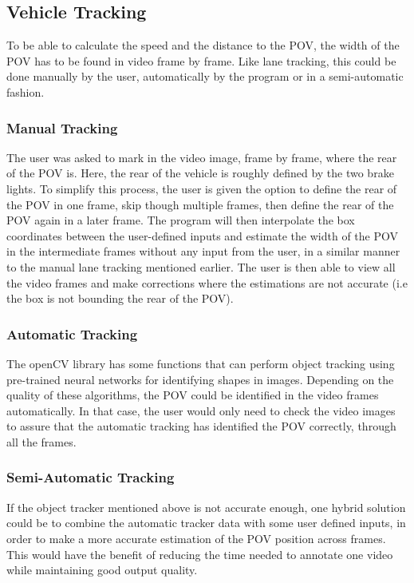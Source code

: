 \subsection{Vehicle Tracking}
To be able to calculate the speed and the distance to the POV, the width of the POV has to be found in video frame by frame. Like lane tracking, this could be done manually by the user, automatically by the program or in a semi-automatic fashion.

\subsubsection{Manual Tracking}
The user was asked to mark in the video image, frame by frame, where the rear of the POV is. Here, the rear of the vehicle is roughly defined by the two brake lights. To simplify this process, the user is given the option to define the rear of the POV in one frame, skip though multiple frames, then define the rear of the POV again in a later frame. The program will then interpolate the box coordinates between the user-defined inputs and estimate the width of the POV in the intermediate frames without any input from the user, in a similar manner to the manual lane tracking mentioned earlier. The user is then able to view all the video frames and make corrections where the estimations are not accurate (i.e the box is not bounding the rear of the POV). 

\subsubsection{Automatic Tracking}
The openCV library has some functions that can perform object tracking using pre-trained neural networks for identifying shapes in images. Depending on the quality of these algorithms, the POV could be identified in the video frames automatically. In that case, the user would only need to check the video images to assure that the automatic tracking has identified the POV correctly, through all the frames. 

\subsubsection{Semi-Automatic Tracking}
If the object tracker mentioned above is not accurate enough, one hybrid solution could be to combine the automatic tracker data with some user defined inputs, in order to make a more accurate estimation of the POV position across frames. This would have the benefit of reducing the time needed to annotate one video while maintaining good output quality.